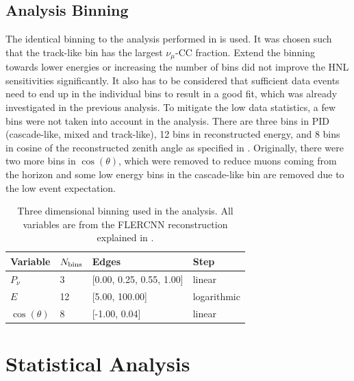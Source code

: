 \subsection{Analysis Binning}

The identical binning to the analysis performed in  is used. It was chosen such that the track-like bin has the largest $\nu_\mu$-CC fraction. Extend the binning towards lower energies or increasing the number of bins did not improve the HNL sensitivities significantly. It also has to be considered that sufficient data events need to end up in the individual bins to result in a good fit, which was already investigated in the previous analysis. To mitigate the low data statistics, a few bins were not taken into account in the analysis. There are three bins in PID (cascade-like, mixed and track-like), 12 bins in reconstructed energy, and 8 bins in cosine of the reconstructed zenith angle as specified in . Originally, there were two more bins in $\cos(\theta)$, which were removed to reduce muons coming from the horizon and some low energy bins in the cascade-like bin are removed due to the low event expectation.

\begin{table}
        \begin{tabular}{ llll }
        \hline\hline
    
        \textbf{Variable} & \textbf{$N_\rm{bins}$} & \textbf{Edges} & \textbf{Step} \\ 
    
        \hline\hline
    
        $P_\nu$ & 3 & [0.00, 0.25, 0.55, 1.00] & linear \\
        $E$ & 12 & [5.00, 100.00] & logarithmic \\
        $\cos(\theta)$ & 8 & [-1.00, 0.04] & linear \\
    
        \hline
        \end{tabular}
    \caption[Analysis binning]{Three dimensional binning used in the analysis. All variables are from the FLERCNN reconstruction explained in .}
\end{table}




\section{Statistical Analysis} 


